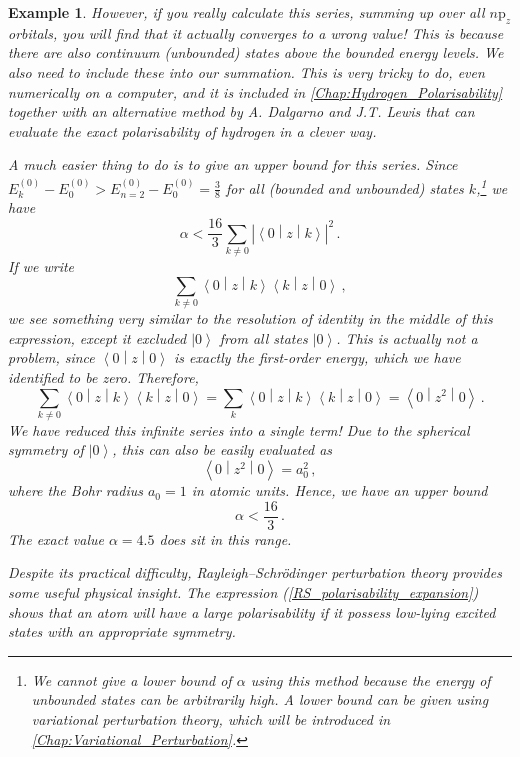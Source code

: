 \documentclass{article}
\theoremstyle{plain}\theoremheaderfont{\normalfont\itshape}\theorembodyfont{\rmfamily}\theoremseparator{.}\newtheorem*{rem}{Remark}\newtheorem*{ex}{Example}\newtheorem*{proof}{Proof}\newtheorem*{altp}{Alternative proof}
\theoremstyle{plain}\theoremheaderfont{\normalfont\bfseries}\theorembodyfont{\rmfamily}\theoremseparator{.}\newtheorem{thm}{Theorem}[section]\newtheorem{lem}[thm]{Lemma}\newtheorem{prop}[thm]{Proposition}\newtheorem*{cor}{Corollary}\newtheorem{defn}[thm]{Definition}\newtheorem{clm}[thm]{Claim}\newtheorem{clminproof}{Claim}
\theoremstyle{break}\theoremheaderfont{\normalfont\itshape}\theorembodyfont{\rmfamily}\theoremseparator{.\medskip}\newtheorem*{proofskip}{Proof}\newtheorem*{exs}{Examples}\newtheorem*{rems}{Remarks}
\theoremstyle{break}\theoremheaderfont{\normalfont\bfseries}\theorembodyfont{\rmfamily}\theoremseparator{.\medskip}\newtheorem{lemskip}[thm]{Lemma}\newtheorem{defnskip}[thm]{Definition}\newtheorem{propskip}[thm]{Proposition}\newtheorem{thmskip}[thm]{Theorem}
\numberwithin{equation}{section}
\newcommand{\ket}[1]{\left| #1 \right\rangle}
\newcommand{\mel}[3]{\left\langle #1 \middle| #2 \middle| #3 \right\rangle}
\newcommand{\abs}[1]{\left| #1 \right|}
\begin{document}
\begin{ex}
        However, if you really calculate this series, summing up over all \(n\mathrm{p}_z\) orbitals, you will find that it actually converges to a wrong value! This is because there are also continuum (unbounded) states above the bounded energy levels. We also need to include these into our summation. This is very tricky to do, even numerically on a computer, and it is included in \cref{Chap:Hydrogen_Polarisability} together with an alternative method by A. Dalgarno and J.T. Lewis that can evaluate the exact polarisability of hydrogen in a clever way.

        A much easier thing to do is to give an upper bound for this series. Since \(E_k^{(0)}-E_0^{(0)}>E_{n=2}^{(0)}-E_{0}^{(0)}=\frac{3}{8}\) for all (bounded and unbounded) states \(k\),\footnote{We cannot give a lower bound of \(\alpha\) using this method because the energy of unbounded states can be arbitrarily high. A lower bound can be given using variational perturbation theory, which will be introduced in \cref{Chap:Variational_Perturbation}.} we have
        \begin{equation}
            \alpha<\frac{16}{3}\sum_{k\ne 0}\abs{\mel{0}{z}{k}}^2\,.
        \end{equation}
        If we write
        \begin{equation}
            \sum_{k\ne 0}\mel{0}{z}{k}\mel{k}{z}{0}\,,
        \end{equation}
        we see something very similar to the resolution of identity in the middle of this expression, except it excluded \(\ket{0}\) from all states \(\ket{0}\). This is actually not a problem, since \(\mel{0}{z}{0}\) is exactly the first-order energy, which we have identified to be zero. Therefore,
        \begin{equation}
            \sum_{k\ne 0}\mel{0}{z}{k}\mel{k}{z}{0}=\sum_{k}\mel{0}{z}{k}\mel{k}{z}{0}=\mel{0}{z^2}{0}\,.
        \end{equation}
        We have reduced this infinite series into a single term! Due to the spherical symmetry of \(\ket{0}\), this can also be easily evaluated as
        \begin{equation}
            \mel{0}{z^2}{0}=a_0^2\,,
        \end{equation}
        where the Bohr radius \(a_0=1\) in atomic units. Hence, we have an upper bound
        \begin{equation}
            \alpha<\frac{16}{3}\,.
        \end{equation}
        The exact value \(\alpha=4.5\) does sit in this range.

        Despite its practical difficulty, Rayleigh--Schr\"{o}dinger perturbation theory provides some useful physical insight. The expression (\ref{RS_polarisability_expansion}) shows that an atom will have a large polarisability if it possess low-lying excited states with an appropriate symmetry.
    \end{ex}
\end{document}

